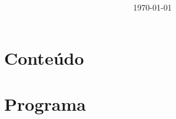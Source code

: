 \documentclass[12pt]{article}
\title{\bfseries\color{Emph}\mytitle}
\author{\myauthor}
\date{\today}
\begin{document}


\maketitle



\renewcommand\contentsname{} %

\section*{Conteúdo}
\begin{multicols}{2} \tableofcontents \end{multicols}

%
%
%
%
%


\restoregeometry


\section*{Programa}
\end{document}
